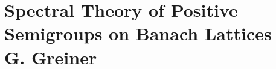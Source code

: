 
\chapter{Spectral Theory of Positive Semigroups on Banach Lattices \\ G. Greiner}\label{chap:C-III}
